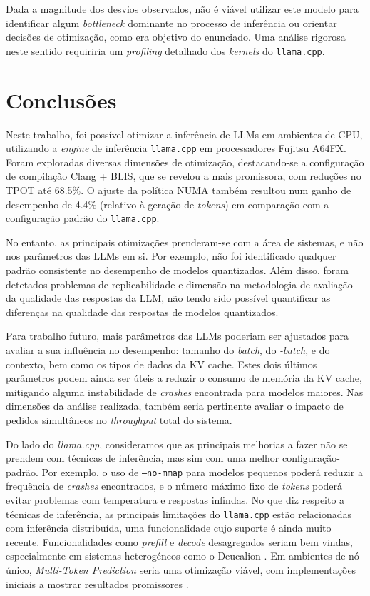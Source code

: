 \documentclass[11pt, a4paper]{article}
\begin{document}
Dada a magnitude dos desvios observados, não é viável utilizar este modelo para identificar algum
\emph{bottleneck} dominante no processo de inferência ou orientar decisões de otimização, como era
objetivo do enunciado. Uma análise rigorosa neste sentido requiriria um \emph{profiling} detalhado
dos \emph{kernels} do \texttt{llama.cpp}.

\section{Conclusões} %

Neste trabalho, foi possível otimizar a inferência de LLMs em ambientes de CPU, utilizando a
\emph{engine} de inferência \texttt{llama.cpp} em processadores Fujitsu A64FX. Foram exploradas
diversas dimensões de otimização, destacando-se a configuração de compilação Clang + BLIS, que se
revelou a mais promissora, com reduções no TPOT até 68.5\%. O ajuste da política NUMA também
resultou num ganho de desempenho de 4.4\% (relativo à geração de \emph{tokens}) em comparação com a
configuração padrão do \texttt{llama.cpp}.

No entanto, as principais otimizações prenderam-se com a área de sistemas, e não nos parâmetros das
LLMs em si. Por exemplo, não foi identificado qualquer padrão consistente no desempenho de modelos
quantizados. Além disso, foram detetados problemas de replicabilidade e dimensão na metodologia
de avaliação da qualidade das respostas da LLM, não tendo sido possível quantificar as diferenças na
qualidade das respostas de modelos quantizados.

Para trabalho futuro, mais parâmetros das LLMs poderiam ser ajustados para avaliar a sua influência
no desempenho: tamanho do \emph{batch}, do \emph{\textmu-batch}, e do contexto, bem como os tipos de
dados da KV cache. Estes dois últimos parâmetros podem ainda ser úteis a reduzir o consumo de
memória da KV cache, mitigando alguma instabilidade de \emph{crashes} encontrada para modelos
maiores. Nas dimensões da análise realizada, também seria pertinente avaliar o impacto de pedidos
simultâneos no \emph{throughput} total do sistema.

Do lado do \emph{llama.cpp}, consideramos que as principais melhorias a fazer não se prendem com
técnicas de inferência, mas sim com uma melhor configuração-padrão. Por exemplo, o uso de
\texttt{--no-mmap} para modelos pequenos poderá reduzir a frequência de \emph{crashes} encontrados,
e o número máximo fixo de \emph{tokens} poderá evitar problemas com temperatura e respostas
infindas. No que diz respeito a técnicas de inferência, as principais limitações do
\texttt{llama.cpp} estão relacionadas com inferência distribuída, uma funcionalidade cujo suporte é
ainda muito recente. Funcionalidades como \emph{prefill} e \emph{decode} desagregados seriam bem
vindas, especialmente em sistemas heterogéneos como o Deucalion
\cite{disaggregated-prefill-decode, llama-issue}. Em ambientes de nó único,
\emph{Multi-Token Prediction} seria uma otimização viável, com implementações iniciais a mostrar
resultados promissores \cite{reddit}.
\end{document}
